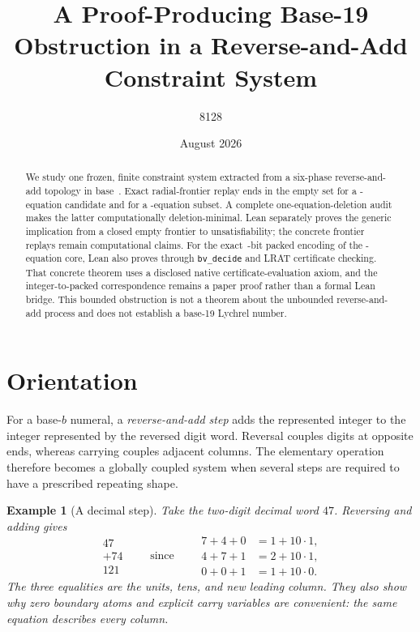 \documentclass[11pt,twoside]{article}
\title{A Proof-Producing Base-19 Obstruction in a Reverse-and-Add Constraint System}
\author{8128}
\date{August 2026}
\newtheorem{example}[definition]{Example}
\theoremstyle{remark}
\begin{document}
\maketitle

\begin{abstract}
We study one frozen, finite constraint system extracted from a six-phase
reverse-and-add topology in base~\BaseValue.  Exact radial-frontier replay
ends in the empty set for a \CandidateEquationCount-equation candidate and
for a \CoreEquationCount-equation subset.  A complete one-equation-deletion
audit makes the latter computationally deletion-minimal.  Lean separately
proves the generic implication from a closed empty frontier to
unsatisfiability; the concrete frontier replays remain computational claims.
For the exact \,\PackedWidth-bit packed encoding of the
\CoreEquationCount-equation core, Lean also proves
\PackedTheorem{} through \texttt{bv\_decide} and LRAT certificate checking.
That concrete theorem uses a disclosed native certificate-evaluation axiom,
and the integer-to-packed correspondence remains a paper proof rather than a
formal Lean bridge.
This bounded obstruction is not a theorem about the unbounded reverse-and-add
process and does not establish a base-19 Lychrel number.
\end{abstract}

\tableofcontents
\clearpage

\section{Orientation}
\label{sec:orientation}

For a base-$b$ numeral, a \emph{reverse-and-add step} adds the represented
integer to the integer represented by the reversed digit word.  Reversal
couples digits at opposite ends, whereas carrying couples adjacent columns.
The elementary operation therefore becomes a globally coupled system when
several steps are required to have a prescribed repeating shape.

\begin{example}[A decimal step]
Take the two-digit decimal word $47$.  Reversing and adding gives
\[
  \begin{array}{r}
      47\\[-2pt]
    + 74\\ \hline
     121
  \end{array}
  \qquad\text{since}\qquad
  \begin{aligned}
    7+4+0 &= 1+10\cdot 1,\\
    4+7+1 &= 2+10\cdot 1,\\
    0+0+1 &= 1+10\cdot 0.
  \end{aligned}
\]
The three equalities are the units, tens, and new leading column.  They also
show why zero boundary atoms and explicit carry variables are convenient:
the same equation describes every column.
\end{example}
\end{document}
